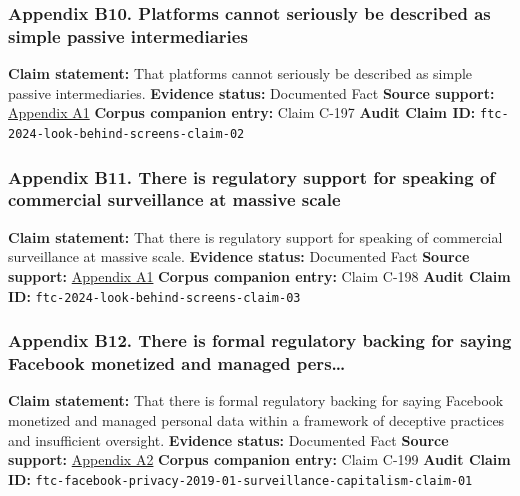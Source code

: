 \documentclass[
  american,
  11pt,
  letterpaper,
]{article}
\begin{document}
\subsubsection{Appendix B10. Platforms cannot seriously be described as
simple passive
intermediaries}\label{ch-01-appendix-b10-platforms-cannot-seriously-be-described-as-simple-passive-intermediaries}

\textbf{Claim statement:} That platforms cannot seriously be described
as simple passive intermediaries. \textbf{Evidence status:} Documented
Fact \textbf{Source support:}
\hyperref[ch-01-appendix-a1-a-look-behind-the-screens-examining-the-data-practices-of-social-media-and-video-streaming-services]{Appendix
A1} \textbf{Corpus companion entry:} Claim C-197 \textbf{Audit Claim
ID:} \texttt{ftc-2024-look-behind-screens-claim-02}

\subsubsection{Appendix B11. There is regulatory support for speaking of
commercial surveillance at massive
scale}\label{ch-01-appendix-b11-there-is-regulatory-support-for-speaking-of-commercial-surveillance-at-massive-scale}

\textbf{Claim statement:} That there is regulatory support for speaking
of commercial surveillance at massive scale. \textbf{Evidence status:}
Documented Fact \textbf{Source support:}
\hyperref[ch-01-appendix-a1-a-look-behind-the-screens-examining-the-data-practices-of-social-media-and-video-streaming-services]{Appendix
A1} \textbf{Corpus companion entry:} Claim C-198 \textbf{Audit Claim
ID:} \texttt{ftc-2024-look-behind-screens-claim-03}

\subsubsection{Appendix B12. There is formal regulatory backing for
saying Facebook monetized and managed
pers\ldots{}}\label{ch-01-appendix-b12-there-is-formal-regulatory-backing-for-saying-facebook-monetized-and-managed-pers}

\textbf{Claim statement:} That there is formal regulatory backing for
saying Facebook monetized and managed personal data within a framework
of deceptive practices and insufficient oversight. \textbf{Evidence
status:} Documented Fact \textbf{Source support:}
\hyperref[ch-01-appendix-a2-ftc-imposes-5-billion-penalty-and-sweeping-new-privacy-restrictions-on-facebook]{Appendix
A2} \textbf{Corpus companion entry:} Claim C-199 \textbf{Audit Claim
ID:}
\texttt{ftc-facebook-privacy-2019-01-surveillance-capitalism-claim-01}
\end{document}
